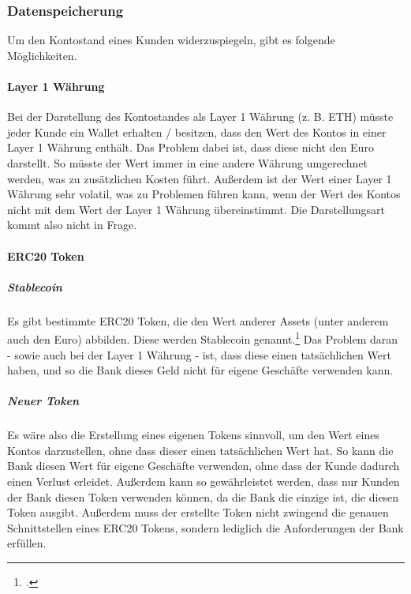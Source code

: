 \subsubsection{Datenspeicherung}
Um den Kontostand eines Kunden widerzuspiegeln, gibt es folgende Möglichkeiten.

\paragraph{Layer 1 Währung}
Bei der Darstellung des Kontostandes als Layer 1 Währung (z. B. ETH) müsste jeder Kunde ein Wallet erhalten / besitzen, dass den Wert des Kontos in einer Layer 1 Währung enthält.
Das Problem dabei ist, dass diese nicht den Euro darstellt. 
So müsste der Wert immer in eine andere Währung umgerechnet werden, was zu zusätzlichen Kosten führt. Außerdem ist der Wert einer Layer 1 Währung sehr volatil, was zu Problemen führen kann, wenn der Wert des Kontos nicht mit dem Wert der Layer 1 Währung übereinstimmt.
Die Darstellungsart kommt also nicht in Frage.

\paragraph{ERC20 Token}


\subparagraph{Stablecoin}
Es gibt bestimmte ERC20 Token, die den Wert anderer Assets (unter anderem auch den Euro) abbilden. Diese werden Stablecoin genannt.\footcite[Vgl. hierzu und weiterführend][4]{q8}
Das Problem daran - sowie auch bei der Layer 1 Währung - ist, dass diese einen tatsächlichen Wert haben, und so die Bank dieses Geld nicht für eigene Geschäfte verwenden kann.

\subparagraph{Neuer Token}
\label{datenspeicherung:neuer-token}
Es wäre also die Erstellung eines eigenen Tokens sinnvoll, um den Wert eines Kontos darzustellen, ohne dass dieser einen tatsächlichen Wert hat. So kann die Bank diesen Wert für eigene Geschäfte verwenden, ohne dass der Kunde dadurch einen Verlust erleidet. 
Außerdem kann so gewährleistet werden, dass nur Kunden der Bank diesen Token verwenden können, da die Bank die einzige ist, die diesen Token ausgibt.
Außerdem muss der erstellte Token nicht zwingend die genauen Schnittstellen eines ERC20 Tokens, sondern lediglich die Anforderungen der Bank erfüllen.

